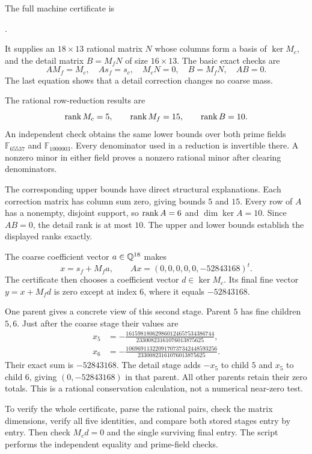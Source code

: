 The full machine certificate is
\begin{center}\small
{}.
\end{center}
It supplies an $18\times13$ rational matrix $N$ whose columns form a basis of $\ker M_c$, and the detail matrix $B=M_fN$ of size $16\times13$. The basic exact checks are
\[
 AM_f=M_c,\quad As_f=s_c,\quad M_cN=0,
 \quad B=M_fN,\quad AB=0.
\]
The last equation shows that a detail correction changes no coarse mass.

The rational row-reduction results are
\[
 \operatorname{rank} M_c=5,\qquad\operatorname{rank} M_f=15,\qquad\operatorname{rank} B=10.
\]
An independent check obtains the same lower bounds over both prime fields $\mathbb F_{65537}$ and $\mathbb F_{1000003}$. Every denominator used in a reduction is invertible there. A nonzero minor in either field proves a nonzero rational minor after clearing denominators.

The corresponding upper bounds have direct structural explanations. Each correction matrix has column sum zero, giving bounds $5$ and $15$. Every row of $A$ has a nonempty, disjoint support, so $\operatorname{rank} A=6$ and $\dim\ker A=10$. Since $AB=0$, the detail rank is at most $10$. The upper and lower bounds establish the displayed ranks exactly.

The coarse coefficient vector $a\in\mathbb Q^{18}$ makes
\[
 x=s_f+M_fa,\qquad Ax=(0,0,0,0,0,-52843168)^t.
\]
The certificate then chooses a coefficient vector $d\in\ker M_c$. Its final fine vector $y=x+M_fd$ is zero except at index $6$, where it equals $-52843168$.

One parent gives a concrete view of this second stage. Parent $5$ has fine children $5,6$. Just after the coarse stage their values are
\begin{align*}
 x_5&=-\frac{161598180629860124657534386744}
                 {23300823161076013875625},\\
 x_6&=-\frac{1069691132209170737342448593256}
                 {23300823161076013875625}.
\end{align*}
Their exact sum is $-52843168$. The detail stage adds $-x_5$ to child $5$ and $x_5$ to child $6$, giving $(0,-52843168)$ in that parent. All other parents retain their zero totals. This is a rational conservation calculation, not a numerical near-zero test.

To verify the whole certificate, parse the rational pairs, check the matrix dimensions, verify all five identities, and compare both stored stages entry by entry. Then check $M_cd=0$ and the single surviving final entry. The script  performs the independent equality and prime-field checks.

